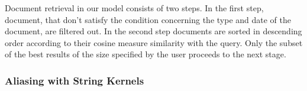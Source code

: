 Document retrieval in our model consists of two steps. In the first step, document, that don't satisfy the condition concerning the type and date of the document, are filtered out. In the second step documents are sorted in descending order according to their cosine measure similarity with the query. Only the subset of the best results of the size specified by the user proceeds to the next stage.


\subsubsection {Aliasing with String Kernels}
\label{sec:aliasing_string_kernel}

